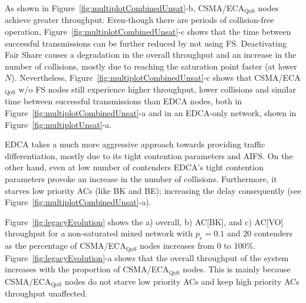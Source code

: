 
As shown in Figure~\ref{fig:multiplotCombinedUnsat}-b, CSMA/ECA$_{\text{QoS}}$ nodes achieve greater throughput. Even-though there are periods of collision-free operation, Figure~\ref{fig:multiplotCombinedUnsat}-c shows that the time between successful transmissions can be further reduced by not using FS. Deactivating Fair Share causes a degradation in the overall throughput and an increase in the number of collisions, mostly due to reaching the saturation point faster (at lower $N$). Nevertheless, Figure~\ref{fig:multiplotCombinedUnsat}-c shows that CSMA/ECA$_{\text{QoS}}$ w/o FS nodes still experience higher throughput, lower collisions and similar time between successful transmissions than EDCA nodes, both in Figure~\ref{fig:multiplotCombinedUnsat}-a and in an EDCA-only network, shown in Figure~\ref{fig:multiplotUnsat}-a.



EDCA takes a much more aggressive approach towards providing traffic differentiation, mostly due to its tight contention parameters and AIFS. On the other hand, even at low number of contenders EDCA's tight contention parameters provoke an increase in the number of collisions. Furthermore, it starves low priority ACs (like BK and BE); increasing the delay consequently (see Figure~\ref{fig:multiplotCombinedUnsat}-a).

Figure~\ref{fig:legacyEvolution} shows the a) overall, b) AC[BK], and c) AC[VO] throughput for a non-saturated mixed network with $p_e=0.1$ and 20 contenders as the percentage of CSMA/ECA$_{\text{QoS}}$ nodes increases from 0 to 100\%. Figure~\ref{fig:legacyEvolution}-a shows that the overall throughput of the system increases with the proportion of CSMA/ECA$_{\text{QoS}}$ nodes. This is mainly because CSMA/ECA$_{\text{QoS}}$ nodes do not starve low priority ACs and keep high priority ACs throughput unaffected.

